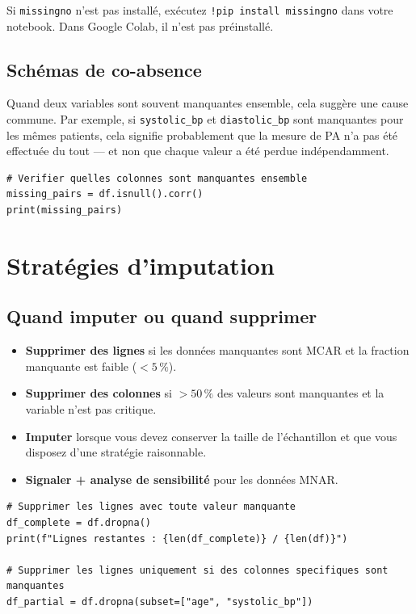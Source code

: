\begin{warningbox}
Si \texttt{missingno} n'est pas install\'e, ex\'ecutez \texttt{!pip install missingno} dans votre notebook. Dans Google Colab, il n'est pas pr\'einstall\'e.
\end{warningbox}

\subsection{Sch\'emas de co-absence}

Quand deux variables sont souvent manquantes ensemble, cela sugg\`ere une cause commune. Par exemple, si \texttt{systolic\_bp} et \texttt{diastolic\_bp} sont manquantes pour les m\^emes patients, cela signifie probablement que la mesure de PA n'a pas \'et\'e effectu\'ee du tout --- et non que chaque valeur a \'et\'e perdue ind\'ependamment.

\begin{verbatim}
# Verifier quelles colonnes sont manquantes ensemble
missing_pairs = df.isnull().corr()
print(missing_pairs)
\end{verbatim}

\section{Strat\'egies d'imputation}

\subsection{Quand imputer ou quand supprimer}

\begin{itemize}
  \item \textbf{Supprimer des lignes} si les donn\'ees manquantes sont MCAR et la fraction manquante est faible ($<5\,\%$).
  \item \textbf{Supprimer des colonnes} si $>50\,\%$ des valeurs sont manquantes et la variable n'est pas critique.
  \item \textbf{Imputer} lorsque vous devez conserver la taille de l'\'echantillon et que vous disposez d'une strat\'egie raisonnable.
  \item \textbf{Signaler + analyse de sensibilit\'e} pour les donn\'ees MNAR.
\end{itemize}

\begin{verbatim}
# Supprimer les lignes avec toute valeur manquante
df_complete = df.dropna()
print(f"Lignes restantes : {len(df_complete)} / {len(df)}")

# Supprimer les lignes uniquement si des colonnes specifiques sont manquantes
df_partial = df.dropna(subset=["age", "systolic_bp"])
\end{verbatim}


